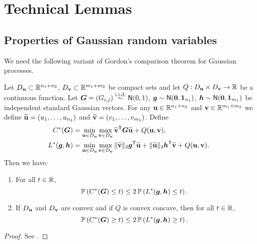 \section{Technical Lemmas}
\label{append_sec:tech}

\subsection{Properties of Gaussian random variables}

We need the following variant of Gordon's comparison theorem for Gaussian processes.
\begin{lem}[CGMT]
    \label{lem:CGMT}
    Let $D_{\mathrm{\bf u}} \subset \mathbb{R}^{n_1 + n_2}$, $D_{\mathrm{\bf v}} \subset \mathbb{R}^{m_1 + m_2}$ be compact sets and let $Q: D_{\mathrm{\bf u}} \times D_{\mathrm{\bf v}} \to \mathbb{R}$ be a continuous function. Let $\text{\boldmath $G$} = (G_{i,j}) \overset{\text{i.i.d.}}{\sim} {\sf N}(0, 1)$, ${\boldsymbol{g}} \sim {\sf N}(\mathrm{\bf 0}, \mathrm{\bf 1}_{n_1})$, $\text{\boldmath $h$} \sim {\sf N}(\mathrm{\bf 0}, \mathrm{\bf 1}_{m_1})$ be independent standard Gaussian vectors. For any $\mathrm{\bf u} \in \mathbb{R}^{n_1 + n_2}$ and $\mathrm{\bf v} \in \mathbb{R}^{m_1 + m_2}$ we define $\widetilde{\mathrm{\bf u}} = (u_1, \dots, u_{n_1})$ and $\widetilde{\mathrm{\bf v}} = (v_1, \dots, v_{m_1})$. Define
    \begin{equation*}
        \begin{aligned}
            C^*(\text{\boldmath $G$})      & = \min_{\mathrm{\bf u} \in D_{\mathrm{\bf u}}} \max_{\mathrm{\bf v} \in D_{\mathrm{\bf v}}}  \widetilde{\mathrm{\bf v}}^{\sf T} \text{\boldmath $G$} \widetilde{\mathrm{\bf u}} + Q(\mathrm{\bf u}, \mathrm{\bf v}), \\
            L^*({\boldsymbol{g}}, \text{\boldmath $h$}) & = \min_{\mathrm{\bf u} \in D_{\mathrm{\bf u}}} \max_{\mathrm{\bf v} \in D_{\mathrm{\bf v}}}  \| \widetilde{\mathrm{\bf v}} \|_2 {\boldsymbol{g}}^{\sf T} \widetilde{\mathrm{\bf u}}
            + \| \widetilde{\mathrm{\bf u}} \|_2 \text{\boldmath $h$}^{\sf T} \widetilde{\mathrm{\bf v}} + Q(\mathrm{\bf u}, \mathrm{\bf v}).
        \end{aligned}
    \end{equation*}
    Then we have:
    \begin{enumerate}[label=(\alph*)]
        \item \label{lem:CGMT(a)}
        For all $t \in \mathbb{R}$,
        \begin{equation*}
            \mathbb{P}\left( C^*(\text{\boldmath $G$}) \le t \right) \le 2 \, \mathbb{P}\left( L^*({\boldsymbol{g}}, \text{\boldmath $h$}) \le t \right).
        \end{equation*}
        \item \label{lem:CGMT(b)}
        If $D_{\mathrm{\bf u}}$ and $D_{\mathrm{\bf v}}$ are convex and if $Q$ is convex concave, then for all $t \in \mathbb{R}$,
        \begin{equation*}
            \mathbb{P}\left( C^*(\text{\boldmath $G$}) \ge t \right) \le 2 \, \mathbb{P}\left( L^*({\boldsymbol{g}}, \text{\boldmath $h$}) \ge t \right).
        \end{equation*}
    \end{enumerate}
\end{lem}
\begin{proof}
    See \cite[Corollary G.1]{miolane2018distributionlassouniformcontrol}.
\end{proof}



